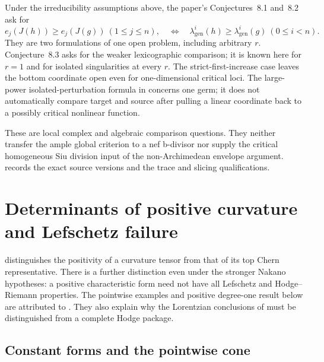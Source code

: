 Under the irreducibility assumptions above, the paper's
Conjectures~8.1 and~8.2 ask for
\[
 e_j(J(h))\geq e_j(J(g))\ (1\leq j\leq n),
 \quad\Longleftrightarrow\quad
 \lambda^i_{\mathrm{gen}}(h)\geq
 \lambda^i_{\mathrm{gen}}(g)\ (0\leq i<n).
\tag{H.86}\label{eq:appH-Segre-componentwise-frontier}
\]
They are two formulations of one open problem, including
arbitrary $r$. Conjecture~8.3 asks for the weaker
lexicographic comparison; it is known here for $r=1$ and
for isolated singularities at every $r$.
The strict-first-increase case leaves the bottom coordinate
open even for one-dimensional critical loci. The large-power
isolated-perturbation formula in
\cite[Theorem~3.5]{Massey24MinkowskiV1} concerns one germ;
it does not automatically compare target and source after
pulling a linear coordinate back to a possibly critical
nonlinear function.

These are local complex and algebraic comparison questions.
They neither transfer the ample global criterion to a nef
b-divisor nor supply the critical homogeneous Siu division
input of the non-Archimedean envelope argument.
 records the exact source
versions and the trace and slicing qualifications.

\section{Determinants of positive curvature and Lefschetz failure}
\label{sec:appH-Nakano-determinants}

 distinguishes the positivity of a
curvature tensor from that of its top Chern representative. There is
a further distinction even under the stronger Nakano hypotheses:
a positive characteristic form need not have all Lefschetz and
Hodge--Riemann properties. The pointwise examples and positive
degree-one result below are attributed to
\cite{Chen26NakanoDeterminantsV2}. They also explain why the
Lorentzian conclusions of 
must be distinguished from a complete Hodge package.

\subsection{Constant forms and the pointwise cone}
\label{sec:appH-Nakano-pointwise-cone}

